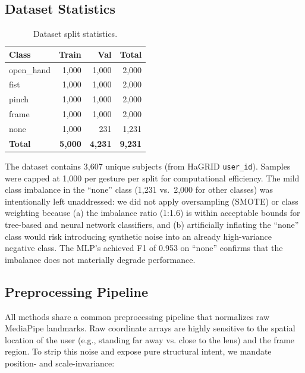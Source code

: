\documentclass[11pt,a4paper]{article}
\begin{document}
\subsection{Dataset Statistics}

\begin{table}[H]
\centering
\caption{Dataset split statistics.}
\label{tab:dataset-stats}
\begin{tabular}{@{}lrrr@{}}
\toprule
\textbf{Class} & \textbf{Train} & \textbf{Val} & \textbf{Total} \\
\midrule
open\_hand & 1,000 & 1,000 & 2,000 \\
fist & 1,000 & 1,000 & 2,000 \\
pinch & 1,000 & 1,000 & 2,000 \\
frame & 1,000 & 1,000 & 2,000 \\
none & 1,000 & 231 & 1,231 \\
\midrule
\textbf{Total} & \textbf{5,000} & \textbf{4,231} & \textbf{9,231} \\
\bottomrule
\end{tabular}
\end{table}

The dataset contains 3,607 unique subjects (from HaGRID \texttt{user\_id}). Samples were capped at 1,000 per gesture per split for computational efficiency. The mild class imbalance in the ``none'' class (1,231 vs.\ 2,000 for other classes) was intentionally left unaddressed: we did not apply oversampling (SMOTE) or class weighting because (a) the imbalance ratio (1:1.6) is within acceptable bounds for tree-based and neural network classifiers, and (b) artificially inflating the ``none'' class would risk introducing synthetic noise into an already high-variance negative class. The MLP's achieved F1 of 0.953 on ``none'' confirms that the imbalance does not materially degrade performance.

\subsection{Preprocessing Pipeline}

All methods share a common preprocessing pipeline that normalizes raw MediaPipe landmarks. Raw coordinate arrays are highly sensitive to the spatial location of the user (e.g., standing far away vs. close to the lens) and the frame region. To strip this noise and expose pure structural intent, we mandate position- and scale-invariance:
\end{document}

